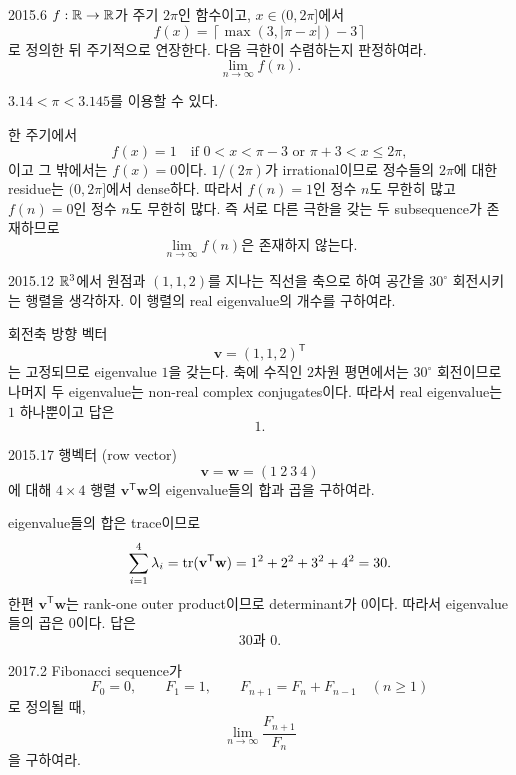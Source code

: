 \begin{pastproblem}{2015.6}
$f:\mathbb{R}\to\mathbb{R}$가 주기 $2\pi$인 함수이고, $x\in(0,2\pi]$에서
\[
f(x)=\left\lceil\max(3,|\pi-x|)-3\right\rceil
\]
로 정의한 뒤 주기적으로 연장한다. 다음 극한이 수렴하는지 판정하여라.
\[
\lim_{n\to\infty}f(n).
\]
\begin{hint}
$3.14<\pi<3.145$를 이용할 수 있다.
\end{hint}
\end{pastproblem}

\begin{solution}
한 주기에서
\[
f(x)=1\quad\text{if }0<x<\pi-3\text{ or }\pi+3<x\le2\pi,
\]
이고 그 밖에서는 $f(x)=0$이다. $1/(2\pi)$가 irrational이므로 정수들의 $2\pi$에 대한 residue는 $(0,2\pi]$에서 dense하다. 따라서 $f(n)=1$인 정수 $n$도 무한히 많고 $f(n)=0$인 정수 $n$도 무한히 많다. 즉 서로 다른 극한을 갖는 두 subsequence가 존재하므로
\[
\boxed{\lim_{n\to\infty}f(n)\text{은 존재하지 않는다}}.
\]
\end{solution}

\begin{pastproblem}{2015.12}
$\mathbb{R}^3$에서 원점과 $(1,1,2)$를 지나는 직선을 축으로 하여 공간을 $30^\circ$ 회전시키는 행렬을 생각하자. 이 행렬의 real eigenvalue의 개수를 구하여라.
\end{pastproblem}

\begin{solution}
회전축 방향 벡터
\[
\mathbf v=(1,1,2)^{\mathsf T}
\]
는 고정되므로 eigenvalue $1$을 갖는다. 축에 수직인 $2$차원 평면에서는 $30^\circ$ 회전이므로 나머지 두 eigenvalue는 non-real complex conjugates이다. 따라서 real eigenvalue는 $1$ 하나뿐이고 답은
\[
\boxed{1}.
\]
\end{solution}

\begin{pastproblem}{2015.17}
행벡터 (row vector)
\[
\mathbf v=\mathbf w=(1\ 2\ 3\ 4)
\]
에 대해 $4\times4$ 행렬 $\mathbf v^{\mathsf T}\mathbf w$의 eigenvalue들의 합과 곱을 구하여라.
\end{pastproblem}

\begin{solution}
eigenvalue들의 합은 trace이므로
\[
\sum_{i=1}^4\lambda_i
=\operatorname{tr}(\mathbf v^{\mathsf T}\mathbf w)
=1^2+2^2+3^2+4^2=30.
\]
한편 $\mathbf v^{\mathsf T}\mathbf w$는 rank-one outer product이므로 determinant가 $0$이다. 따라서 eigenvalue들의 곱은 $0$이다. 답은
\[
\boxed{30\text{과 }0}.
\]
\end{solution}

\begin{pastproblem}{2017.2}
Fibonacci sequence가
\[
F_0=0,\qquad F_1=1,\qquad F_{n+1}=F_n+F_{n-1}\quad(n\ge1)
\]
로 정의될 때,
\[
\lim_{n\to\infty}\frac{F_{n+1}}{F_n}
\]
을 구하여라.
\end{pastproblem}

